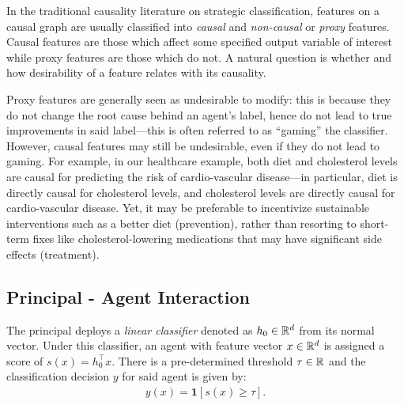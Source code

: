 \begin{remark}
In the traditional causality literature on strategic classification, features on a causal graph are usually classified into \textit{causal} and \textit{non-causal} or \emph{proxy} features. Causal features are those which affect some specified output variable of interest while proxy features are those which do not. A natural question is whether and how desirability of a feature relates with its causality. 

Proxy features are generally seen as undesirable to modify: this is because they do not change the root cause behind an agent's label, hence do not lead to true improvements in said label---this is often referred to as ``gaming'' the classifier. However, causal features may still be undesirable, even if they do not lead to gaming. For example, in our healthcare example, both diet and cholesterol levels are causal for predicting the risk of cardio-vascular disease---in particular, diet is directly causal for cholesterol levels, and cholesterol levels are directly causal for cardio-vascular disease. Yet, it may be preferable to incentivize sustainable interventions such as a better diet (prevention), rather than resorting to short-term fixes like cholesterol-lowering medications that may have significant side effects (treatment). 
\end{remark}

\subsection{Principal - Agent Interaction}

The principal deploys a \emph{linear classifier} denoted as $h_0 \in \mathbb{R}^{d}$ from its normal vector. Under this classifier, an agent with feature vector $x \in \mathbb{R}^{d}$ is assigned a score of $s(x) = h_0^\top x$. There is a pre-determined threshold $\tau \in \mathbb{R}$ and the classification decision $y$ for said agent is given by: 
\begin{align*}
    y(x) = \mathbf{1}\left[s(x) \geq \tau \right]. 
\end{align*}

